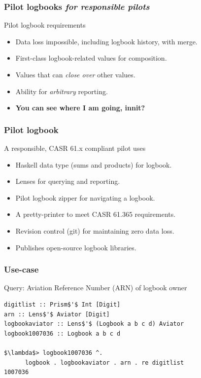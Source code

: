 \begin{frame}
\frametitle{Pilot logbooks \emph{for responsible pilots}}
\begin{block}{Pilot logbook requirements}
\begin{itemize}
\item<1-> Data loss impossible, including logbook history, with merge.
\item<2-> First-class logbook-related values for composition.
\item<3-> Values that can \emph{close over} other values.
\item<4-> Ability for \emph{arbitrary} reporting.
\item<5-> \textbf{You can see where I am going, innit?}
\end{itemize}
\end{block}
\end{frame}

\begin{frame}
\frametitle{Pilot logbook}
\begin{block}{A responsible, CASR 61.x compliant pilot uses}
\begin{itemize}
\item<1-> Haskell data type (sums and products) for logbook.
\item<1-> Lenses for querying and reporting.
\item<1-> Pilot logbook zipper for navigating a logbook.
\item<1-> A pretty-printer to meet CASR 61.365 requirements.
\item<1-> Revision control (git) for maintaining zero data loss.
\item<1-> Publishes open-source logbook libraries.
\end{itemize}
\end{block}
\end{frame}

\begin{frame}[fragile]
\frametitle{Use-case}
\begin{block}{Query: Aviation Reference Number (ARN) of logbook owner}
\begin{lstlisting}[style=haskell,basicstyle=\scriptsize\ttfamily,mathescape]
digitlist :: Prism$'$ Int [Digit]
arn :: Lens$'$ Aviator [Digit]
logbookaviator :: Lens$'$ (Logbook a b c d) Aviator
logbook1007036 :: Logbook a b c d

$\lambda$> logbook1007036 ^.
      logbook . logbookaviator . arn . re digitlist
1007036
\end{lstlisting}
\end{block}
\end{frame}

